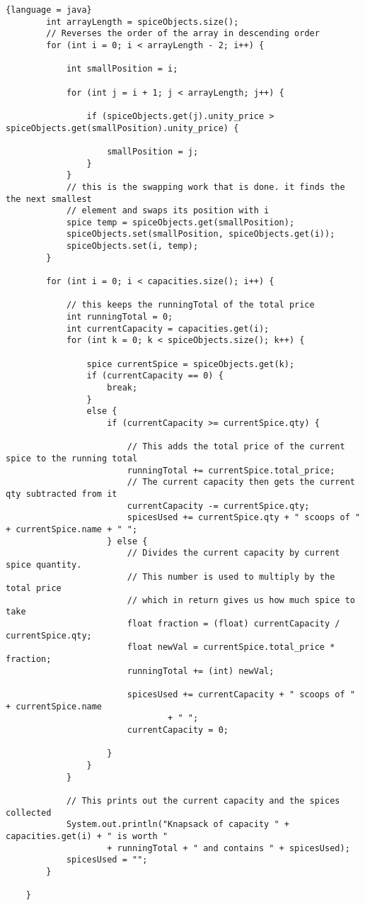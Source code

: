 \documentclass{article}
\begin{document}
\begin{lstlisting}{language = java}
        int arrayLength = spiceObjects.size();
        // Reverses the order of the array in descending order
        for (int i = 0; i < arrayLength - 2; i++) {
        
            int smallPosition = i;
            
            for (int j = i + 1; j < arrayLength; j++) {

                if (spiceObjects.get(j).unity_price > spiceObjects.get(smallPosition).unity_price) {

                    smallPosition = j;
                }
            }
            // this is the swapping work that is done. it finds the the next smallest
            // element and swaps its position with i
            spice temp = spiceObjects.get(smallPosition);
            spiceObjects.set(smallPosition, spiceObjects.get(i));
            spiceObjects.set(i, temp);
        }

        for (int i = 0; i < capacities.size(); i++) {

            // this keeps the runningTotal of the total price
            int runningTotal = 0;
            int currentCapacity = capacities.get(i);
            for (int k = 0; k < spiceObjects.size(); k++) {
            
                spice currentSpice = spiceObjects.get(k);
                if (currentCapacity == 0) {
                    break;
                } 
                else {
                    if (currentCapacity >= currentSpice.qty) {

                        // This adds the total price of the current spice to the running total
                        runningTotal += currentSpice.total_price;
                        // The current capacity then gets the current qty subtracted from it
                        currentCapacity -= currentSpice.qty;
                        spicesUsed += currentSpice.qty + " scoops of " + currentSpice.name + " ";
                    } else {
                        // Divides the current capacity by current spice quantity.
                        // This number is used to multiply by the total price
                        // which in return gives us how much spice to take
                        float fraction = (float) currentCapacity / currentSpice.qty;
                        float newVal = currentSpice.total_price * fraction;
                        runningTotal += (int) newVal;

                        spicesUsed += currentCapacity + " scoops of " + currentSpice.name
                                + " ";
                        currentCapacity = 0;

                    }
                }
            }

            // This prints out the current capacity and the spices collected
            System.out.println("Knapsack of capacity " + capacities.get(i) + " is worth "
                    + runningTotal + " and contains " + spicesUsed);
            spicesUsed = "";
        }

    }

\end{lstlisting}
\end{document}
